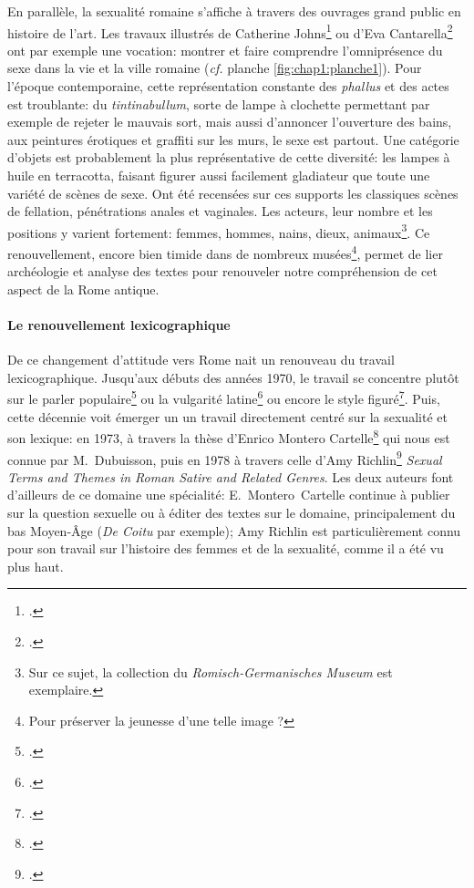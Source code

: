 En parallèle, la sexualité romaine s'affiche à travers des ouvrages grand public en histoire de l'art. Les travaux illustrés de Catherine Johns\footcite{johns2000sex} ou d'Eva Cantarella\footcite{cantarella_pompei_2000} ont par exemple une vocation: montrer et faire comprendre l'omniprésence du sexe dans la vie et la ville romaine (\textit{cf.} planche \ref{fig:chap1:planche1}). Pour l'époque contemporaine, cette représentation constante des \textit{phallus} et des actes est troublante: du \textit{tintinabullum}, sorte de lampe à clochette permettant par exemple de rejeter le mauvais sort, mais aussi d'annoncer l'ouverture des bains, aux peintures érotiques et graffiti sur les murs, le sexe est partout. Une catégorie d'objets est probablement la plus représentative de cette diversité: les lampes à huile en terracotta, faisant figurer aussi facilement gladiateur que toute une variété de scènes de sexe. Ont été recensées sur ces supports les classiques scènes de fellation, pénétrations anales et vaginales. Les acteurs, leur nombre et les positions y varient fortement: femmes, hommes, nains, dieux, animaux\footnote{Sur ce sujet, la collection du \textit{Romisch-Germanisches Museum} est exemplaire.}. Ce renouvellement, encore bien timide dans de nombreux musées\footnote{Pour préserver la jeunesse d'une telle image ?}, permet de lier archéologie et analyse des textes pour renouveler notre compréhension de cet aspect de la Rome antique.

\paragraph{Le renouvellement lexicographique}

De ce changement d'attitude vers Rome nait un renouveau du travail lexicographique. Jusqu'aux débuts des années 1970, le travail se concentre plutôt sur le parler populaire\footcite{otto_sprichworter_1890} ou la vulgarité latine\footcite{opelt1970schimpfworter} ou encore le style figuré\footcite{opelt1966euphemismus}. Puis, cette décennie voit émerger un un travail directement centré sur la sexualité et son lexique: en 1973, à travers la thèse d'Enrico Montero Cartelle\footcite{montero_cartelle_aspectos_1973} qui nous est connue par M.~Dubuisson, puis en 1978 à travers celle d'Amy Richlin\footcite{richlin_sexual_1978} \textit{Sexual Terms and Themes in Roman Satire and Related Genres}. Les deux auteurs font d'ailleurs de ce domaine une spécialité: E.~Montero~Cartelle continue à publier sur la question sexuelle ou à éditer des textes sur le domaine, principalement du bas Moyen-Âge (\textit{De Coitu} par exemple); Amy Richlin est particulièrement connu pour son travail sur l'histoire des femmes et de la sexualité, comme il a été vu plus haut. 

